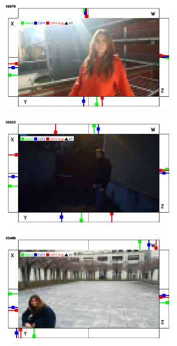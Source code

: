 \begin{figure}[H]
\begin{center}
\begin{subfigure}[h]{0.49\textwidth}
		\end{subfigure}
		\vfill
		\begin{subfigure}[h]{0.49\textwidth}
			\centering
			\includegraphics[width=0.98\textwidth]{"contents/images/qualitative-videos/perfect4-house01-6979"}
		\end{subfigure}
		\hfill
		\begin{subfigure}[h]{0.49\textwidth}
			\centering
			\includegraphics[width=0.98\textwidth]{"contents/images/qualitative-videos/dark-courtyard02-5523"}
		\end{subfigure}
		\vfill
		\begin{subfigure}[h]{0.49\textwidth}
			\centering
			\includegraphics[width=0.98\textwidth]{"contents/images/qualitative-videos/perfect4-square01-3488"}

\end{subfigure}
\end{center}
\end{figure}
